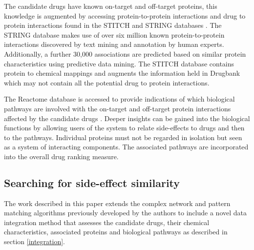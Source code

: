 \documentclass[preprint,11pt]{elsarticle}
\begin{document}
The candidate drugs have known on-target and off-target proteins, this knowledge is augmented by accessing protein-to-protein interactions and drug to protein interactions found in the STITCH and STRING databases \cite{Kuhn2012}. The STRING database  makes use of over six million known protein-to-protein interactions discovered by text mining and annotation by human experts. Additionally,  a further 30,000 associations are predicted based on similar protein characteristics using predictive data mining. The STITCH database contains protein to chemical mappings and augments the information held in Drugbank which may not contain all the potential drug to protein interactions. 

The Reactome database is accessed to provide indications of which biological pathways are involved with the on-target and off-target protein interactions affected by the candidate drugs \cite{Yu2015c}. Deeper insights can be gained into the biological functions by allowing users of the system to relate side-effects to drugs and then to the pathways. Individual proteins must not be regarded in isolation but seen as a system of interacting components. The associated pathways are incorporated into the overall drug ranking measure.


\subsection{Searching for side-effect similarity}
The work described in this paper extends the complex network and pattern matching algorithms previously developed by the authors \cite{McGarry2015a, McGarry2015b,McGarry2016a} to include a novel data integration method that  assesses the candidate drugs, their chemical characteristics, associated proteins and biological pathways as described in section \ref{integration}. 
\end{document}

